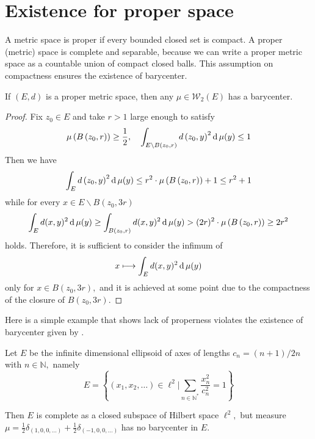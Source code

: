 \section{Existence for proper space}

A metric space is proper if every bounded closed set is compact.
A proper (metric) space is complete and separable,
because we can write a proper metric space as a countable union of compact closed balls.
This assumption on compactness ensures the existence of barycenter.

\begin{prop}
	\label{lem:existence_proper_space}
	If \( ( E , d ) \) is a proper metric space, then any \( \mu \in \mathcal{W}_ { 2 } ( E ) \) has a barycenter.
\end{prop}

\begin{proof}
	Fix \( z _ { 0 } \in E \) and take \( r > 1 \) large enough to satisfy
	\[ \mu \left( B \left( z _ { 0 } , r \right) \right) \geq \frac { 1 } { 2 } , \quad \int _ { E \backslash B \left( z _ { 0 } , r \right) } d \left( z _ { 0 } , y \right) ^ { 2 } \operatorname{d} \mu ( y ) \leq 1 \]
	Then we have
	\[ \int _ { E } d \left( z _ { 0 } , y \right) ^ { 2 } \operatorname{d} \mu ( y ) \leq r ^ { 2 } \cdot \mu \left( B \left( z _ { 0 } , r \right) \right) + 1 \leq r ^ { 2 } + 1 \]
	while for every \( x \in E \backslash B \left( z _ { 0 } , 3 r \right) \)
	\[ \int _ { E } d ( x , y ) ^ { 2 } \operatorname{d} \mu ( y ) \geq \int _ { B \left( z _ { 0 } , r \right) } d ( x , y ) ^ { 2 } \operatorname{d} \mu ( y ) > ( 2 r ) ^ { 2 } \cdot \mu \left( B \left( z _ { 0 } , r \right) \right) \geq 2 r ^ { 2 } \]
	holds.
	Therefore, it is sufficient to consider the infimum of
	\[ x \longmapsto \int _ { E } d ( x , y ) ^ { 2 } \operatorname{d} \mu ( y ) \]
	only for \( x \in B \left( z _ { 0 } , 3 r \right) , \) and it is achieved at some point due to the compactness of the closure of \( B \left( z _ { 0 } , 3 r \right) . \)
\end{proof}

Here is a simple example that shows lack of properness
violates the existence of barycenter given by \cite[Example 3.1 (a)]{ohta2012barycenters}.

\begin{example}
	\label{example:ellipsoid_subspace}
	Let \( E \) be the infinite dimensional ellipsoid of axes of lengths \( c _ { n } = ( n + 1 ) / 2 n \) with \( n \in \mathbb { N } , \) namely
	\[
		E = \left\{ \left( x _ { 1 } , x _ { 2 } , \ldots \right) \in \ell^2 | \sum _ { n \in \mathbb { N }^* } \frac { x _ { n } ^ { 2 } } { c _ { n } ^ { 2 } } = 1 \right\}
	\]

	Then \( E \) is complete as a closed subspace of Hilbert space $\ell^2,$
	but measure $\mu = \frac{1}{2}\delta _ { ( 1,0,0 , \ldots ) } + \frac{1}{2} \delta _ { ( - 1,0,0 , \ldots ) } $  has no barycenter in \( E \).
\end{example}

